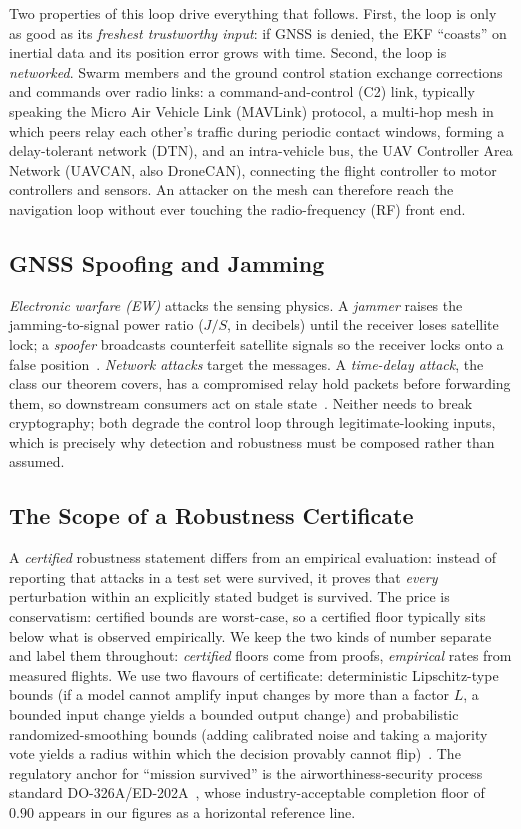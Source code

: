 Two properties of this loop drive everything that follows. First, the loop is
only as good as its \emph{freshest trustworthy input}: if GNSS is denied, the
EKF ``coasts'' on inertial data and its position error grows with time. Second,
the loop is \emph{networked}. Swarm members and the ground control station
exchange corrections and commands over radio links: a command-and-control (C2) link, typically
speaking the Micro Air Vehicle Link (MAVLink) protocol, a multi-hop mesh in which peers relay each other's traffic
during periodic contact windows, forming a delay-tolerant network (DTN), and an
intra-vehicle bus, the UAV Controller Area Network (UAVCAN, also DroneCAN),
connecting the flight controller to motor controllers and sensors. An attacker on the mesh can therefore reach the
navigation loop without ever touching the radio-frequency (RF) front end.

\subsection{GNSS Spoofing and Jamming}
\emph{Electronic warfare (EW)} attacks the sensing physics. A \emph{jammer}
raises the jamming-to-signal power ratio ($J/S$, in decibels) until the
receiver loses satellite lock; a \emph{spoofer}
broadcasts counterfeit satellite signals so the receiver locks onto a false
position~\cite{humphreys2008assessing,kerns2014capture}. \emph{Network attacks}
target the messages. A \emph{time-delay attack}, the class our theorem
covers, has a compromised relay hold packets before forwarding them, so
downstream consumers act on stale state~\cite{lou2019timedelay,datamut2026}.
Neither needs to break cryptography; both degrade the control loop through
legitimate-looking inputs, which is precisely why detection and robustness must
be composed rather than assumed.

\subsection{The Scope of a Robustness Certificate}
A \emph{certified} robustness statement differs from an empirical evaluation:
instead of reporting that attacks in a test set were survived, it proves that
\emph{every} perturbation within an explicitly stated budget is survived. The
price is conservatism: certified bounds are worst-case, so a certified floor
typically sits below what is observed empirically. We keep the two kinds of
number separate and label them throughout: \emph{certified} floors come from
proofs, \emph{empirical} rates from measured flights. We use two flavours of
certificate: deterministic Lipschitz-type bounds (if a model cannot amplify
input changes by more than a factor $L$, a bounded input change yields a bounded
output change) and probabilistic randomized-smoothing bounds (adding calibrated
noise and taking a majority vote yields a radius within which the decision
provably cannot flip)~\cite{cohen2019smoothing}. The regulatory anchor for
``mission survived'' is the airworthiness-security process standard
DO-326A/ED-202A~\cite{do326a}, whose industry-acceptable completion floor of
$0.90$ appears in our figures as a horizontal reference line.


